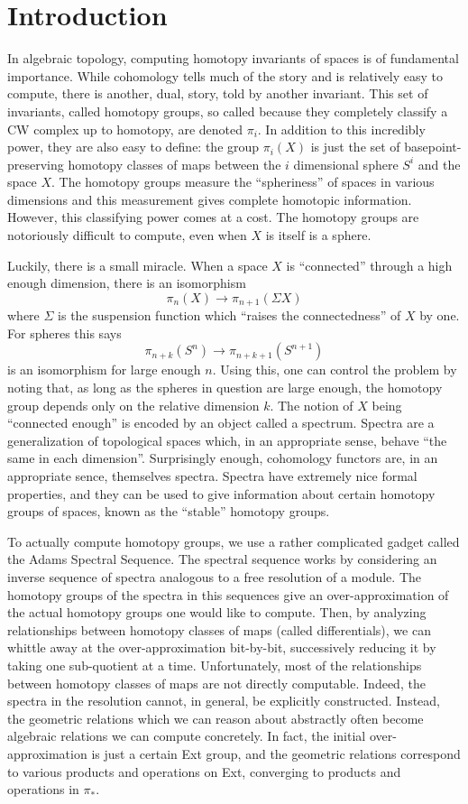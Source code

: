 \section{Introduction}

In algebraic topology, computing homotopy invariants of spaces is of fundamental importance.  
While cohomology tells much of the story and is relatively easy to compute, there is another, dual, story, told by another invariant.
This set of invariants, called homotopy groups, so called because they completely classify a CW complex up to homotopy, are denoted $\pi_i$.  
In addition to this incredibly power, they are also easy to define: the group $\pi_i(X)$ is just the set of basepoint-preserving homotopy classes of maps between the $i$ dimensional sphere $S^i$ and the space $X$.
The homotopy groups measure the ``spheriness'' of spaces in various dimensions and this measurement gives complete homotopic information.
However, this classifying power comes at a cost.  The homotopy groups are notoriously difficult to compute, even when $X$ is itself is a sphere.  

Luckily, there is a small miracle.
When a space $X$ is ``connected'' through a high enough dimension, there is an isomorphism
\[\pi_{n}(X)\to \pi_{n+1}(\Sigma X)\]
where $\Sigma$ is the suspension function which ``raises the connectedness'' of $X$ by one.  For spheres this says
\[\pi_{n+k}(S^n)\to \pi_{n+k+1}(S^{n+1})\]
is an isomorphism for large enough $n$.  
Using this, one can control the problem by noting that, as long as the spheres in question are large enough, the homotopy group depends only on the relative dimension $k$.
The notion of $X$ being ``connected enough'' is encoded by an object called a spectrum.
Spectra are a generalization of topological spaces which, in an appropriate sense, behave ``the same in each dimension''.
Surprisingly enough, cohomology functors are, in an appropriate sence, themselves spectra.  
Spectra have extremely nice formal properties, and they can be used to give information about certain homotopy groups of spaces, known as the ``stable'' homotopy groups.

To actually compute homotopy groups, we use a rather complicated gadget called the Adams Spectral Sequence.  
The spectral sequence works by considering an inverse sequence of spectra analogous to a free resolution of a module.
The homotopy groups of the spectra in this sequences give an over-approximation of the actual homotopy groups one would like to compute.
Then, by analyzing relationships between homotopy classes of maps (called differentials), we can whittle away at the over-approximation bit-by-bit, successively reducing it by taking one sub-quotient at a time.
Unfortunately, most of the relationships between homotopy classes of maps are not directly computable.  
Indeed, the spectra in the resolution cannot, in general, be explicitly constructed.
Instead, the geometric relations which we can reason about abstractly often become algebraic relations we can compute concretely.  
In fact, the initial over-approximation is just a certain Ext group, and the geometric relations correspond to various products and operations on Ext, converging to products and operations in $\pi_*$.  

